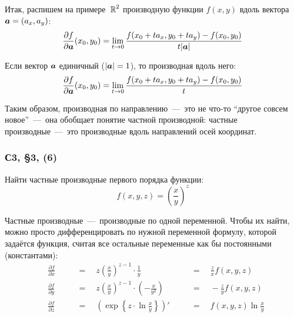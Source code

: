 \documentclass[a4paper,12pt]{article}
\begin{document}
  Итак, распишем на примере~$\operatorname{\mathbb R}^2$ производную функции $f(x, y)$ вдоль вектора~$\bds a \hm= (a_x, a_y)$:
  \[
    \frac{\partial f}{\partial \boldsymbol a}(x_0, y_0) = \lim_{t \to 0} \frac{f(x_0 + t a_x, y_0 + t a_y) - f(x_0, y_0)}{t |\boldsymbol a|}
  \]

  Если вектор $\boldsymbol a$ единичный ($|\bds a| \hm= 1$), то производная вдоль него:
  \begin{equation}\label{eq:derivative-along-vector}
    \frac{\partial f}{\partial \boldsymbol a}(x_0, y_0) = \lim_{t \to 0} \frac{f(x_0 + t a_x, y_0 + t a_y) - f(x_0, y_0)}{t}
  \end{equation}

  Таким образом, производная по направлению~---~это не что-то ``другое совсем новое''~---~она обобщает понятие частной производной: частные производные~---~это производные вдоль направлений осей координат.
  

  \subsubsection{С3, \S 3, (6)}

  Найти частные производные первого порядка функции:
  \[
    f(x, y, z) = \left(\frac{x}{y}\right)^{\! z}  %
  \]
  
  \begin{solution}
    Частные производные~---~производные по одной переменной.
    Чтобы их найти, можно просто дифференцировать по нужной переменной формулу, которой задаётся функция, считая все остальные переменные как бы постоянными (константами):
    \[
        \begin{alignedat}{3}
          &\frac{\partial f}{\partial x} & \quad &= \quad z \left(\frac{x}{y}\right)^{\! z - 1} \cdot \frac{1}{y} & \quad  &= \quad \frac{z}{x} f(x, y, z)\\
          &\frac{\partial f}{\partial y} & &= \quad z \left(\frac{x}{y}\right)^{\! z - 1} \cdot \left(-\frac{x}{y^2}\right) & &= \quad -\frac{z}{y} f(x, y, z)\\
          &\frac{\partial f}{\partial z} & &= \quad \left(\exp\left\{z \cdot \ln\frac{x}{y}\right\}\right)' & &= \quad f(x, y, z) \ln \frac{x}{y}
        \end{alignedat}
    \]
  \end{solution}
  
\end{document}
